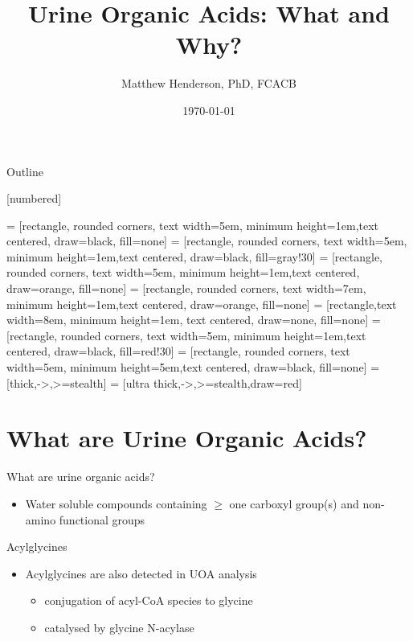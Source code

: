 \documentclass[presentation, smaller]{beamer}
\author{Matthew Henderson, PhD, FCACB}
\date{\today}
\title{Urine Organic Acids: What and Why?}
\institute[NSO]{Newborn Screening Ontario}
\begin{document}
\maketitle
\begin{frame}{Outline}
\tableofcontents
\end{frame}



\vspace{220pt}
\beamertemplatenavigationsymbolsempty
{}[numbered]


 = [rectangle, rounded corners, text width=5em, minimum height=1em,text centered, draw=black, fill=none]
 = [rectangle, rounded corners, text width=5em, minimum height=1em,text centered, draw=black, fill=gray!30]
 = [rectangle, rounded corners, text width=5em, minimum height=1em,text centered, draw=orange, fill=none]
 = [rectangle, rounded corners, text width=7em, minimum height=1em,text centered, draw=orange, fill=none]
 = [rectangle,text width=8em, minimum height=1em, text centered, draw=none, fill=none]
 = [rectangle, rounded corners, text width=5em, minimum height=1em,text centered, draw=black, fill=red!30]
 = [rectangle, rounded corners, text width=5em, minimum height=5em,text centered, draw=black, fill=none]
 = [thick,->,>=stealth]
 = [ultra thick,->,>=stealth,draw=red]

\section{What are Urine Organic Acids?}
\label{sec:orgheadline8}
\begin{frame}[label={sec:orgheadline1}]{What are urine organic acids?}
\begin{itemize}
\item Water soluble compounds containing \(\ge\) one carboxyl group(s) and
non-amino functional groups
\end{itemize}

\centering
{}

\begin{block}{Acylglycines}
\begin{itemize}
\item Acylglycines are also detected in UOA analysis
\begin{itemize}
\item conjugation of acyl-CoA species to glycine
\item catalysed by glycine N-acylase
\end{itemize}
\end{itemize}
\end{block}
\end{frame}
\end{document}
